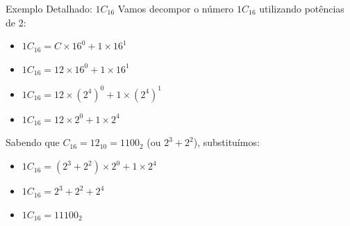 \begin{frame}{Exemplo Detalhado: $1C_{16}$}
    Vamos decompor o número $1C_{16}$ utilizando potências de 2:

    \begin{itemize}
        \item $1C_{16} = C \times 16^0 + 1 \times 16^1$
        \item $1C_{16} = 12 \times 16^0 + 1 \times 16^1$
        \item $1C_{16} = 12 \times (2^4)^0 + 1 \times (2^4)^1$
        \item $1C_{16} = 12 \times 2^0 + 1 \times 2^4$
    \end{itemize}

    Sabendo que $C_{16} = 12_{10} = 1100_2$ (ou $2^3 + 2^2$), substituímos:

    \begin{itemize}
        \item $1C_{16} = (2^3 + 2^2) \times 2^0 + 1 \times 2^4$
        \item $1C_{16} = 2^3 + 2^2 + 2^4$
        \item $1C_{16} = 11100_2$
    \end{itemize}
\end{frame}

